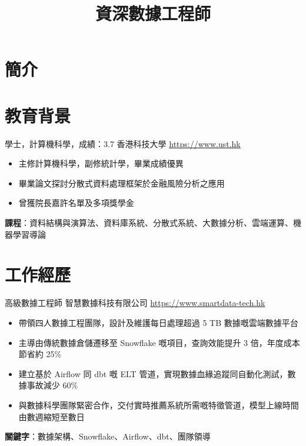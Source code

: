 \documentclass[a4paper, serif, 10pt]{moderncv}
\title{資深數據工程師}
\begin{document}
\maketitle

\section{簡介}

\section{教育背景}

        {學士，計算機科學，成績：3.7}
        {香港科技大學}
        {\url{https://www.ust.hk}}
        {}
        {\begin{itemize}
\item 主修計算機科學，副修統計學，畢業成績優異
\item 畢業論文探討分散式資料處理框架於金融風險分析之應用
\item 曾獲院長嘉許名單及多項獎學金
\end{itemize}
\textbf{課程}：資料結構與演算法、資料庫系統、分散式系統、大數據分析、雲端運算、機器學習導論}
\section{工作經歷}

        {高級數據工程師}
        {智慧數據科技有限公司}
        {\url{https://www.smartdata-tech.hk}}
        {}
        {\begin{itemize}
\item 帶領四人數據工程團隊，設計及維護每日處理超過 5 TB 數據嘅雲端數據平台
\item 主導由傳統數據倉儲遷移至 Snowflake 嘅項目，查詢效能提升 3 倍，年度成本節省約 25\%
\item 建立基於 Airflow 同 dbt 嘅 ELT 管道，實現數據血緣追蹤同自動化測試，數據事故減少 60\%
\item 與數據科學團隊緊密合作，交付實時推薦系統所需嘅特徵管道，模型上線時間由數週縮短至數日
\end{itemize}
\textbf{關鍵字}：數據架構、Snowflake、Airflow、dbt、團隊領導}
\end{document}
